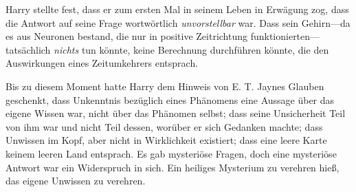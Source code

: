 Harry stellte fest, dass er zum ersten Mal in seinem Leben in Erwägung zog, dass die Antwort auf seine Frage wortwörtlich \emph{unvorstellbar} war. Dass sein Gehirn—da es aus Neuronen bestand, die nur in positive Zeitrichtung funktionierten—tatsächlich \emph{nichts} tun könnte, keine Berechnung durchführen könnte, die den Auswirkungen eines Zeitumkehrers entsprach.

Bis zu diesem Moment hatte Harry dem Hinweis von E. T. Jaynes Glauben geschenkt, dass Unkenntnis bezüglich eines Phänomens eine Aussage über das eigene Wissen war, nicht über das Phänomen selbst; dass seine Unsicherheit Teil von ihm war und nicht Teil dessen, worüber er sich Gedanken machte; dass Unwissen im Kopf, aber nicht in Wirklichkeit existiert; dass eine leere Karte keinem leeren Land entsprach. Es gab mysteriöse Fragen, doch eine mysteriöse Antwort war ein Widerspruch in sich. Ein heiliges Mysterium zu verehren hieß, das eigene Unwissen zu verehren.

